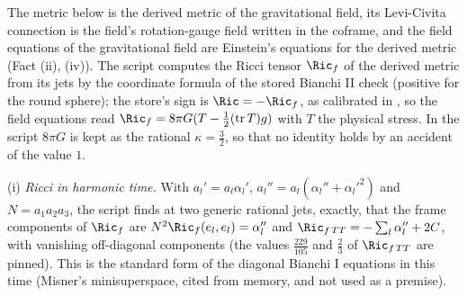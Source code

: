 The metric below is the derived metric of the gravitational field, its Levi-Civita connection is the field's rotation-gauge field written in the coframe, and the field equations of the gravitational field are Einstein's equations for the derived metric (Fact (ii), (iv)). The script computes the Ricci tensor $\Ric_{f}$ of the derived metric from its jets by the coordinate formula of the stored Bianchi II check (positive for the round sphere); the store's sign is $\Ric = -\Ric_{f}$, as calibrated in , so the field equations read $\Ric_{f} = 8\pi G(T - \tfrac12(\operatorname{tr}T)g)$ with $T$ the physical stress. In the script $8\pi G$ is kept as the rational $\kappa = \tfrac32$, so that no identity holds by an accident of the value $1$.

(i) \emph{Ricci in harmonic time.} With $a_{l}' = a_{l}\alpha_{l}'$, $a_{l}'' = a_{l}(\alpha_{l}'' + \alpha_{l}'^{2})$ and $N = a_{1}a_{2}a_{3}$, the script finds at two generic rational jets, exactly, that the frame components of $\Ric_{f}$ are $N^{2}\Ric_{f}(e_{l}, e_{l}) = \alpha_{l}''$ and $\Ric_{f\,TT} = -\sum_{l}\alpha_{l}'' + 2C$, with vanishing off-diagonal components (the values $\tfrac{229}{105}$ and $\tfrac23$ of $\Ric_{f\,TT}$ are pinned). This is the standard form of the diagonal Bianchi I equations in this time (Misner's minisuperspace, cited from memory, and not used as a premise).

